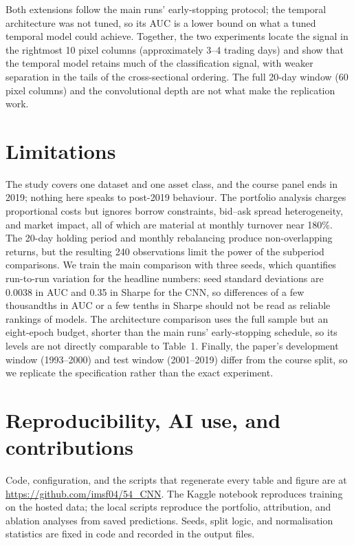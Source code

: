 \documentclass[10pt]{article}
\begin{document}
Both extensions follow the main runs' early-stopping protocol; the temporal architecture was not tuned, so its AUC is a lower bound on what a tuned temporal model could achieve. Together, the two experiments locate the signal in the rightmost 10 pixel columns (approximately 3--4 trading days) and show that the temporal model retains much of the classification signal, with weaker separation in the tails of the cross-sectional ordering. The full 20-day window (60 pixel columns) and the convolutional depth are not what make the replication work.

\section{Limitations}

The study covers one dataset and one asset class, and the course panel ends in 2019; nothing here speaks to post-2019 behaviour. The portfolio analysis charges proportional costs but ignores borrow constraints, bid--ask spread heterogeneity, and market impact, all of which are material at monthly turnover near 180\%. The 20-day holding period and monthly rebalancing produce non-overlapping returns, but the resulting 240 observations limit the power of the subperiod comparisons. We train the main comparison with three seeds, which quantifies run-to-run variation for the headline numbers: seed standard deviations are 0.0038 in AUC and 0.35 in Sharpe for the CNN, so differences of a few thousandths in AUC or a few tenths in Sharpe should not be read as reliable rankings of models. The architecture comparison uses the full sample but an eight-epoch budget, shorter than the main runs' early-stopping schedule, so its levels are not directly comparable to Table~1. Finally, the paper's development window (1993--2000) and test window (2001--2019) differ from the course split, so we replicate the specification rather than the exact experiment.

\section{Reproducibility, AI use, and contributions}

Code, configuration, and the scripts that regenerate every table and figure are at \url{https://github.com/imsf04/54_CNN}. The Kaggle notebook reproduces training on the hosted data; the local scripts reproduce the portfolio, attribution, and ablation analyses from saved predictions. Seeds, split logic, and normalisation statistics are fixed in code and recorded in the output files.
\end{document}

